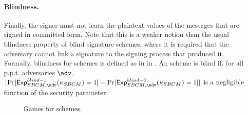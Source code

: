 \paragraph{Blindness.} %
Finally, the signer must not learn the plaintext values of the messages that are
signed in committed form. Note that this is a weaker notion than the usual
blindness property of blind signature schemes, where it is required that the
adversary cannot link a signature to the signing process that produced it.
Formally, blindness for \SBCM schemes is defined as in \ExpSBCMBlindb in
. An \SBCM scheme is blind if, for all p.p.t.
adversaries $\adv$, $|\Pr[\ExpSBCMBlindo(\SBCMsecpar) = 1] -
\Pr[\ExpSBCMBlindz(\SBCMsecpar) = 1]|$ is a negligible function of the security
parameter.

\begin{figure}[ht!]
  \begin{minipage}[t]{\textwidth}
    \centering
    
    
  \end{minipage}
  \label{fig:sbcm-games}
  \caption{Games for \SBCM schemes.}
\end{figure}

